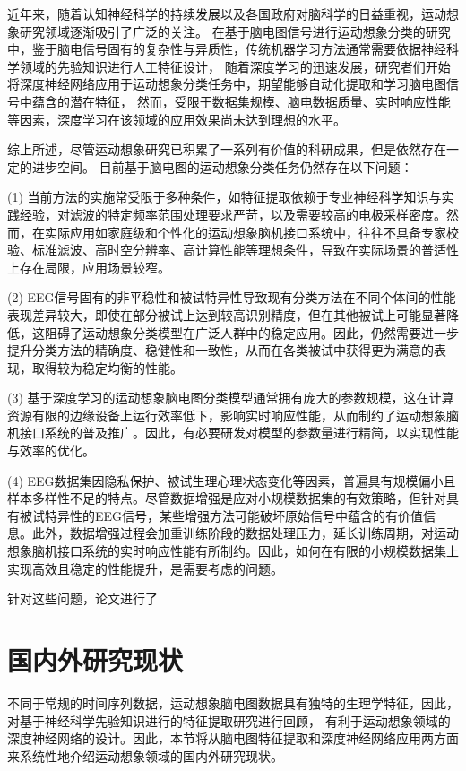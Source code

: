 近年来，随着认知神经科学的持续发展以及各国政府对脑科学的日益重视，运动想象研究领域逐渐吸引了广泛的关注。
在基于脑电图信号进行运动想象分类的研究中，鉴于脑电信号固有的复杂性与异质性，传统机器学习方法通常需要依据神经科学领域的先验知识进行人工特征设计，
随着深度学习的迅速发展，研究者们开始将深度神经网络应用于运动想象分类任务中，期望能够自动化提取和学习脑电图信号中蕴含的潜在特征，
然而，受限于数据集规模、脑电数据质量、实时响应性能等因素，深度学习在该领域的应用效果尚未达到理想的水平。

综上所述，尽管运动想象研究已积累了一系列有价值的科研成果，但是依然存在一定的进步空间。
目前基于脑电图的运动想象分类任务仍然存在以下问题：

(1) 当前方法的实施常受限于多种条件，如特征提取依赖于专业神经科学知识与实践经验，对滤波的特定频率范围处理要求严苛，以及需要较高的电极采样密度。然而，在实际应用如家庭级和个性化的运动想象脑机接口系统中，往往不具备专家校验、标准滤波、高时空分辨率、高计算性能等理想条件，导致在实际场景的普适性上存在局限，应用场景较窄。

(2) EEG信号固有的非平稳性和被试特异性导致现有分类方法在不同个体间的性能表现差异较大，即使在部分被试上达到较高识别精度，但在其他被试上可能显著降低，这阻碍了运动想象分类模型在广泛人群中的稳定应用。因此，仍然需要进一步提升分类方法的精确度、稳健性和一致性，从而在各类被试中获得更为满意的表现，取得较为稳定均衡的性能。

(3) 基于深度学习的运动想象脑电图分类模型通常拥有庞大的参数规模，这在计算资源有限的边缘设备上运行效率低下，影响实时响应性能，从而制约了运动想象脑机接口系统的普及推广。因此，有必要研发对模型的参数量进行精简，以实现性能与效率的优化。

(4) EEG数据集因隐私保护、被试生理心理状态变化等因素，普遍具有规模偏小且样本多样性不足的特点。尽管数据增强是应对小规模数据集的有效策略，但针对具有被试特异性的EEG信号，某些增强方法可能破坏原始信号中蕴含的有价值信息。此外，数据增强过程会加重训练阶段的数据处理压力，延长训练周期，对运动想象脑机接口系统的实时响应性能有所制约。因此，如何在有限的小规模数据集上实现高效且稳定的性能提升，是需要考虑的问题。

针对这些问题，论文进行了

\section{国内外研究现状}

不同于常规的时间序列数据，运动想象脑电图数据具有独特的生理学特征，因此，对基于神经科学先验知识进行的特征提取研究进行回顾，
有利于运动想象领域的深度神经网络的设计。因此，本节将从脑电图特征提取和深度神经网络应用两方面来系统性地介绍运动想象领域的国内外研究现状。

